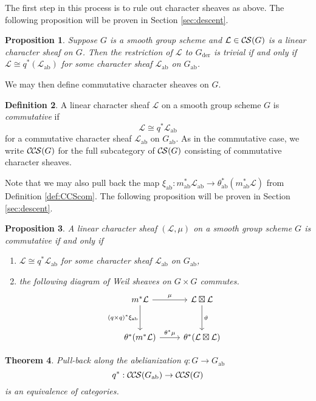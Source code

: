 \documentclass[10pt]{amsart}
\theoremstyle{plain}
\newtheorem{theorem}{Theorem}[section]
\newtheorem{proposition}[theorem]{Proposition}
\theoremstyle{definition}
\newtheorem{definition}[theorem]{Definition}
\newcommand{\der}{_{\operatorname{der}}}
\newcommand{\ab}{_{\operatorname{ab}}}
\newcommand{\cs}[1]{{\mathcal{#1}}}
\newcommand{\CS}{{\mathcal{C\hskip-0.8pt S}}}
\newcommand{\CCS}{{\mathcal{C\hskip-.8pt C\hskip-0.8pt S}}}
\begin{document}
The first step in this process is to rule out character sheaves as above.
The following proposition will be proven in Section \ref{sec:descent}.
\begin{proposition} \label{prop:Gder_triv}
Suppose $G$ is a smooth group scheme and $\cs{L} \in \CS(G)$ is a linear character sheaf on $G$.
Then the restriction of $\cs{L}$ to $G\der$ is trivial if and only if $\cs{L} \cong q^*(\cs{L}\ab)$ for some
character sheaf $\cs{L}\ab$ on $G\ab$.
\end{proposition}

We may then define commutative character sheaves on $G$.

\begin{definition}\label{def:CCS}
A linear character sheaf $\cs{L}$ on a smooth group scheme $G$ is \emph{commutative} if
\[
\cs{L} \cong q^* \cs{L}\ab
\]
for a commutative character sheaf $\cs{L}\ab$ on $G\ab$.  As in the commutative case,
we write $\CCS(G)$ for the full subcategory of $\CS(G)$ consisting of commutative character sheaves.
\end{definition}

Note that we may also pull back the map $\xi\ab : m\ab^* \cs{L}\ab \to \theta\ab^*(m\ab^* \cs{L})$ from Definition \ref{def:CCScom}.
The following proposition will be proven in Section \ref{sec:descent}.

\begin{proposition} \label{prop:Gdiagram}
A linear character sheaf $(\cs{L}, \mu)$ on a smooth group scheme $G$ is commutative if and only if
\begin{enumerate}
\item $\cs{L} \cong q^* \cs{L}\ab$ for some character sheaf $\cs{L}\ab$ on $G\ab$,
\item the following diagram of Weil sheaves on $G \times G$ commutes.
  \[
  \begin{tikzcd}[row sep=30]
   m^*\cs{L} \arrow{d}[swap]{(q\times q)^*\xi\ab} \arrow{r}{\mu} & \cs{L}\boxtimes\cs{L} \arrow{d}{\vartheta}\\
   \theta^*(m^*\cs{L}) \arrow{r}{{\theta}^*\mu} &  \theta^*(\cs{L}\boxtimes\cs{L})
  \end{tikzcd}
  \]
\end{enumerate}
\end{proposition}

\begin{theorem}\label{thm:Gab}
Pull-back along the abelianization $q : G \to G\ab$
\[
q^* : \CCS(G\ab) \to \CCS(G)
\]
is an equivalence of categories.
\end{theorem}
\end{document}
